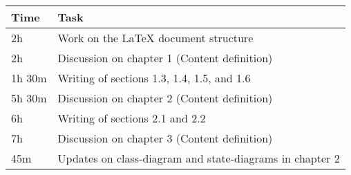 \begin{center}
    {\renewcommand{\arraystretch}{2}%
    \begin{tabular}{L{2cm}L{12cm}}
        \hline
        \textbf{Time} & \textbf{Task} \\
        \hline
        2h & Work on the LaTeX document structure \\
        \hline
        2h & Discussion on chapter 1 (Content definition) \\
        \hline
        1h 30m& Writing of sections 1.3, 1.4, 1.5, and 1.6 \\
        \hline
        5h 30m & Discussion on chapter 2 (Content definition) \\
        \hline
        6h & Writing of sections 2.1 and 2.2 \\
        \hline
        7h & Discussion on chapter 3 (Content definition) \\
        \hline
        45m & Updates on class-diagram and state-diagrams in chapter 2 \\
        \hline
    \end{tabular}}
\end{center}